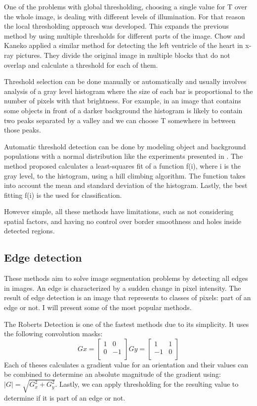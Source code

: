 \documentclass[12pt]{report}
\begin{document}
	One of the problems with global thresholding, choosing a single value for T over the whole image, is dealing with different levels of illumination. For that reason the local thresholding approach was developed. This expands the previous method by using multiple thresholds for different parts of the image. Chow and Kaneko \cite{segmentation_thresh_multiple} applied a similar method for detecting the left ventricle of the heart in x-ray pictures. They divide the original image in multiple blocks that do not overlap and calculate a threshold for each of them.
	
	Threshold selection can be done manually or automatically and usually involves analysis of a gray level histogram where the size of each bar is proportional to the number of pixels with that brightness\cite{review_on_image_segm_tech}. For example, in an image that contains some objects in front of a darker background the histogram is likely to contain two peaks separated by a valley and we can choose T somewhere in between those peaks. 
	
	Automatic threshold detection can be done by modeling object and background populations with a normal distribution like the experiments presented in \cite{experiments_on_thresholding}. The method proposed calculates a least-squares fit of a function f(i), where i is the gray level, to the histogram, using a hill climbing algorithm. The function takes into account the mean and standard deviation of the histogram. Lastly, the best fitting f(i) is the used for classification.
	
	However simple, all these methods have limitations, such as not considering spatial factors, and having no control over border smoothness and holes inside detected regions.
	
	\subsection{Edge detection}
	These methods aim to solve image segmentation problems by detecting all edges in images. An edge is characterized by a sudden change in pixel intensity\cite{image_segmentation_techniques}. The result of edge detection is an image that represents to classes of pixels: part of an edge or not. I will present some of the most popular methods.
	
	The Roberts Detection\cite{edge_detection_survey} is one of the fastest methods due to its simplicity. It uses the following convolution masks:
	\[
	Gx =
	\begin{bmatrix}
		1 & 0 \\
		0 & -1 \\
	\end{bmatrix}
	Gy =
	\begin{bmatrix}
	1 & 1 \\
	-1 & 0 \\
	\end{bmatrix}
	\]
	Each of theses calculates a gradient value for an orientation and their values can be combined to determine an absolute magnitude of the gradient using: \(|G|=\sqrt{G_x^2 + G_y^2}\). Lastly, we can apply thresholding for the resulting value to determine if it is part of an edge or not.
	
\end{document}

